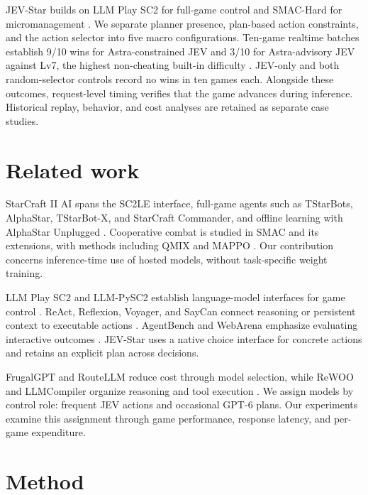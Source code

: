 \documentclass{article}
\begin{document}
JEV-Star builds on LLM Play SC2 for full-game control and SMAC-Hard for micromanagement \citep{ma2023textsc2,deng2024smachard}. We separate planner presence, plan-based action constraints, and the action selector into five macro configurations. Ten-game realtime batches establish 9/10 wins for Astra-constrained JEV and 3/10 for Astra-advisory JEV against Lv7, the highest non-cheating built-in difficulty \citep{blizzard2026sc2protocol}. JEV-only and both random-selector controls record no wins in ten games each. Alongside these outcomes, request-level timing verifies that the game advances during inference. Historical replay, behavior, and cost analyses are retained as separate case studies.

\section{Related work}

StarCraft II AI spans the SC2LE interface, full-game agents such as TStarBots, AlphaStar, TStarBot-X, and StarCraft Commander, and offline learning with AlphaStar Unplugged \citep{vinyals2017sc2le,sun2018tstarbots,vinyals2019alphastar,han2020tstarbotx,wang2020scc,mathieu2023unplugged}. Cooperative combat is studied in SMAC and its extensions, with methods including QMIX and MAPPO \citep{samvelyan2019smac,ellis2022smacv2,deng2024smachard,rashid2018qmix,yu2021mappo}. Our contribution concerns inference-time use of hosted models, without task-specific weight training.

LLM Play SC2 and LLM-PySC2 establish language-model interfaces for game control \citep{ma2023textsc2,li2024llmpysc2}. ReAct, Reflexion, Voyager, and SayCan connect reasoning or persistent context to executable actions \citep{yao2022react,shinn2023reflexion,wang2023voyager,ahn2022saycan}. AgentBench and WebArena emphasize evaluating interactive outcomes \citep{liu2023agentbench,zhou2023webarena}. JEV-Star uses a native choice interface for concrete actions and retains an explicit plan across decisions.

FrugalGPT and RouteLLM reduce cost through model selection, while ReWOO and LLMCompiler organize reasoning and tool execution \citep{chen2023frugalgpt,ong2024routellm,xu2023rewoo,kim2023llmcompiler}. We assign models by control role: frequent JEV actions and occasional GPT-6 plans. Our experiments examine this assignment through game performance, response latency, and per-game expenditure.

\section{Method}
\end{document}

